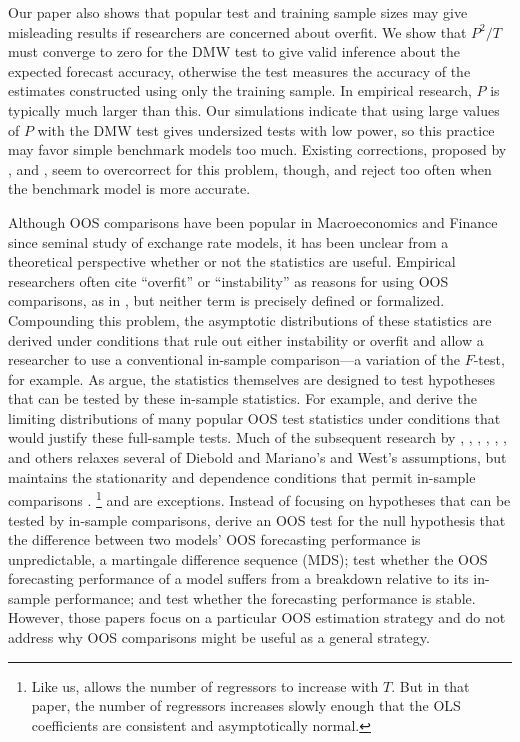 \documentclass[12pt]{article}
\begin{document}
Our paper also shows that popular test and training sample sizes may
give misleading results if researchers are concerned about overfit.
We show that $P^2/T$ must converge to zero for the DMW test to give
valid inference about the expected forecast accuracy, otherwise the
test measures the accuracy of the estimates constructed using only the
training sample.  In empirical research, $P$ is typically much larger
than this.  Our simulations indicate that using large values of $P$
with the DMW test gives undersized tests with low power, so this
practice may favor simple benchmark models too much.  Existing
corrections, proposed by \citet{ClM:01,ClM:05}, \citet{Mcc:07} and
\citet{ClW:06,ClW:07}, seem to overcorrect for this problem, though, and reject
too often when the benchmark model is more accurate.

Although OOS comparisons have been popular in Macroeconomics and
Finance since  seminal study of exchange rate models,
it has been unclear from a theoretical perspective whether or not the
statistics are useful.  Empirical researchers often cite ``overfit''
or ``instability'' as reasons for using OOS comparisons, as in
\citet{StW:03}, but neither term is precisely defined or formalized.
Compounding this problem, the asymptotic distributions of these
statistics are derived under conditions that rule out either
instability or overfit and allow a researcher to use a conventional
in-sample comparison---a variation of the $F$-test, for example.  As
\citet{InK:04} argue, the statistics themselves are designed to test
hypotheses that can be tested by these in-sample statistics.  For
example, \citet{DiM:95} and \citet{Wes:96} derive the limiting
distributions of many popular OOS test statistics under conditions
that would justify these full-sample tests.  Much
of the subsequent research by \citet{Mcc:00, Mcc:07}, \citet{CCS:01},
\citet{ClM:01,ClM:05}, \citet{CoS:02,CoS:04}, \citet{ClW:06,ClW:07},
\citet{Ana:07}, and others relaxes several of Diebold and Mariano's
and West's assumptions, but maintains the stationarity and dependence
conditions that permit in-sample comparisons \citep[see][for a
review of this literature]{Wes:06}.%
\footnote{Like us, \citet{Ana:07} allows the number of regressors to
  increase with $T$.  But in that paper, the number of regressors
  increases slowly enough that the OLS coefficients are consistent and
  asymptotically normal.} %
\citet{GiW:06} and
\citet{GiR:09, GiR:10} are exceptions.  Instead of focusing on
hypotheses that can be tested by in-sample comparisons, \citet{GiW:06}
derive an OOS test for the null hypothesis that the difference
between two models' OOS forecasting performance is unpredictable, a
martingale difference sequence (MDS); \citet{GiR:09} test whether the OOS
forecasting performance of a model suffers from a breakdown relative
to its in-sample performance; and \citet{GiR:10} test whether the
forecasting performance is stable. However, those papers focus on a
particular OOS estimation strategy and do not address why OOS
comparisons might be useful as a general strategy.
\end{document}
